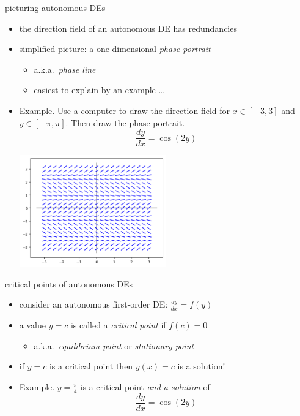 \documentclass{beamer}
\begin{document}
\begin{frame}{picturing autonomous DEs}

\begin{itemize}
\item the direction field of an autonomous DE has redundancies
\item simplified picture: a one-dimensional \emph{phase portrait}
    \begin{itemize}
    \item a.k.a.~\emph{phase line}
    \item easiest to explain by an example \dots
    \end{itemize}

\medskip
\item \begin{minipage}[t]{0.32\textwidth} \small
Example.  Use a computer to draw the direction field for $x \in [-3,3]$ and $y\in [-\pi,\pi]$.  Then draw the phase portrait. 
    $$\frac{dy}{dx} = \cos(2y)$$
\end{minipage}

\vspace{-30mm}
\hfill \includegraphics[width=0.5\textwidth]{figs/autonomous-cos} \phantom{dfjsdf}
\end{itemize}
\end{frame}


\begin{frame}{critical points of autonomous DEs}

\begin{itemize}
\item consider an autonomous first-order DE: \quad $\frac{dy}{dx} = f(y)$
\item a value $y=c$ is called a \emph{critical point} if $f(c)=0$
    \begin{itemize}
    \item a.k.a.~\emph{equilibrium point} or \emph{stationary point}
    \end{itemize}

\medskip
\item if $y=c$ is a critical point then $y(x)=c$ is a solution!

\medskip
\item Example.  $y=\frac{\pi}{4}$ is a critical point \emph{and a solution} of
    $$\frac{dy}{dx} = \cos(2y)$$

\vspace{5mm}
\end{itemize}
\end{frame}
\end{document}
